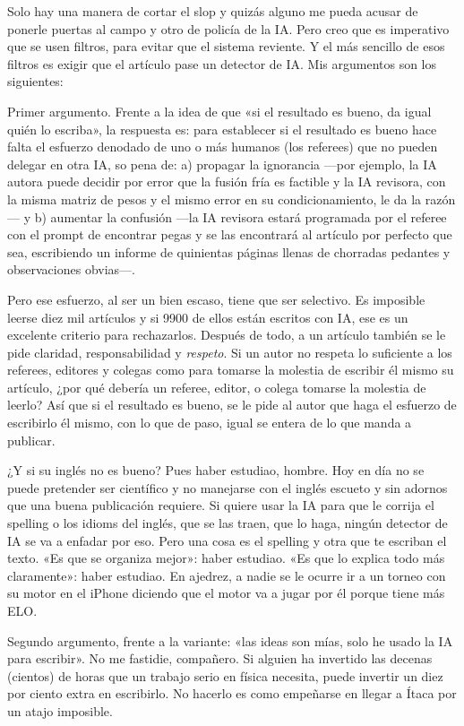 \documentclass[11pt,a4paper]{article}
\begin{document}
Solo hay una manera de cortar el slop y quizás alguno me pueda acusar de ponerle puertas al campo y otro de policía de la IA. Pero creo que es imperativo que se usen filtros, para evitar que el sistema reviente. Y el más sencillo de esos filtros es exigir que el artículo pase un detector de IA. Mis argumentos son los siguientes: 

Primer argumento. Frente a la idea de que «si el resultado es bueno, da igual quién lo escriba», la respuesta es: para establecer si el resultado es bueno hace falta el esfuerzo denodado de uno o más humanos (los referees) que no pueden delegar en otra IA, so pena de: a) propagar la ignorancia ---por ejemplo, la IA autora puede decidir por error que la fusión fría es factible y la IA revisora, con la misma matriz de pesos y el mismo error en su condicionamiento, le da la razón--- y b) aumentar la confusión ---la IA revisora estará programada por el referee con el prompt de encontrar pegas y se las encontrará al artículo por perfecto que sea, escribiendo un informe de quinientas páginas llenas de chorradas pedantes y observaciones obvias---. 

Pero ese esfuerzo, al ser un bien escaso, tiene que ser selectivo. Es imposible leerse diez mil artículos y si 9900 de ellos están escritos con IA, ese es un excelente criterio para rechazarlos. Después de todo, a un artículo también se le pide claridad, responsabilidad y \emph{respeto}. Si un autor no respeta lo suficiente a los referees, editores y colegas como para tomarse la molestia de escribir él mismo su artículo, ¿por qué debería un referee, editor, o colega tomarse la molestia de leerlo? Así que si el resultado es bueno, se le pide al autor que haga el esfuerzo de escribirlo él mismo, con lo que de paso, igual se entera de lo que manda a publicar. 

¿Y si su inglés no es bueno? Pues haber estudiao, hombre. Hoy en día no se puede pretender ser científico y no manejarse con el inglés escueto y sin adornos que una buena publicación requiere. Si quiere usar la IA para que le corrija el spelling o los idioms del inglés, que se las traen, que lo haga, ningún detector de IA se va a enfadar por eso. Pero una cosa es el spelling y otra que te escriban el texto. «Es que se organiza mejor»: haber estudiao. «Es que lo explica todo más claramente»: haber estudiao. En ajedrez, a nadie se le ocurre ir a un torneo con su motor en el iPhone diciendo que el motor va a jugar por él porque tiene más ELO.

Segundo argumento, frente a la variante: «las ideas son mías, solo he usado la IA para escribir». No me fastidie, compañero. Si alguien ha invertido las decenas (cientos) de horas que un trabajo serio en física necesita, puede invertir un diez por ciento extra en escribirlo. No hacerlo es como empeñarse en llegar a Ítaca por un atajo imposible. 
\end{document}
